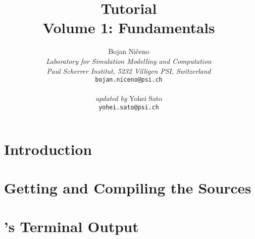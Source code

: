 \documentclass[a4paper]{book}
\begin{document}
  \title{ {\Huge {\bfseries\psiboil} {\bf Tutorial}} \\
           \vspace{10mm}
          {\huge {\bf Volume 1: Fundamentals} } }

  \author{{\Large Bojan Ni\v{c}eno}                     \\
          {\em Laboratory for Simulation Modelling and Computation} \\
          {\em Paul Scherrer Institut, 5232 Villigen PSI, Switzerland}  \\
          {\tt bojan.niceno@psi.ch} \\ \\
          {\em updated by} {\Large Yohei Sato} \\
          {\tt yohei.sato@psi.ch}}

  \maketitle

  \clearemptydoublepage


  \tableofcontents

  \clearemptydoublepage


  \chapter{Introduction}
  

  \chapter{Getting and Compiling the {\psiboil} Sources}
  
  

  \chapter{{\psiboil}'s Terminal Output}
  
  
\end{document}
